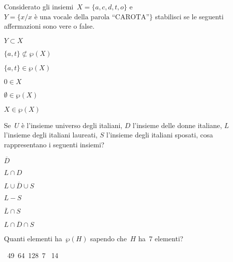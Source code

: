 \begin{esercizio}
\label{ese:7.71}
Considerato gli insiemi~\(X=\{a,c,d,t,o\}\) e 
\(Y=\{x/x\text{ è una vocale della parola ``CAROTA''}\}\)
stabilisci se le seguenti affermazioni sono vere o false.

\TabPositions{8cm}
\begin{multicols}{3}
\begin{enumeratea}
\item \(Y \subset X\) \hfill \boxV\quad\boxF
\item \(\{a,t\}\not\subset \wp (X)\) \hfill \boxV\quad\boxF
\item \(\{a,t\}\in \wp (X)\) \hfill \boxV\quad\boxF
\item \(0\in X\) \hfill \boxV\quad\boxF
\item \(\emptyset \in \wp (X)\) \hfill \boxV\quad\boxF
\item \(X\in \wp (X)\) \hfill \boxV\quad\boxF
\end{enumeratea}
\end{multicols}
\end{esercizio}

\begin{esercizio}
\label{ese:7.72}
Se~\(U\) è l'insieme universo degli italiani, \(D\) l'insieme delle donne italiane,
\(L\) l'insieme degli italiani laureati, \(S\) l'insieme degli italiani sposati, 
cosa rappresentano
i seguenti insiemi?
\begin{multicols}{3}
\begin{enumeratea}
\item \(\overline{D}\)
\item \(L\cap D\)
\item \(\overline{{L\cup D\cup S}}\)
\item \(L-S\)
\item \(\overline{{L}}\cap S\)
\item \(\overline{{L\cap D\cap S}}\)
\end{enumeratea}
\end{multicols}
\end{esercizio}

\begin{esercizio}
\label{ese:7.73}
Quanti elementi ha~\(\wp (H)\) sapendo che~\(H\) ha~7 elementi?
\begin{center}
 
\boxA\quad~49\quad\boxB\quad~64\quad\boxC\quad~128\quad\boxD\quad~7\quad
\boxE\quad~14
\end{center}
\end{esercizio}

